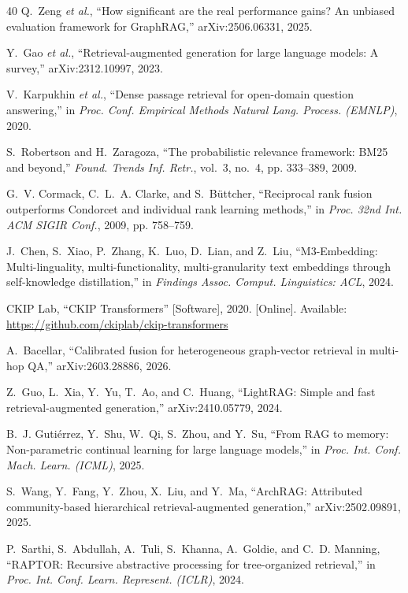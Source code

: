 \begin{thebibliography}{40}
Q.~Zeng \emph{et al.}, ``How significant are the real performance gains?
An unbiased evaluation framework for GraphRAG,'' arXiv:2506.06331, 2025.

Y.~Gao \emph{et al.}, ``Retrieval-augmented generation for large language
models: A survey,'' arXiv:2312.10997, 2023.

V.~Karpukhin \emph{et al.}, ``Dense passage retrieval for open-domain
question answering,'' in \emph{Proc. Conf. Empirical Methods Natural
Lang. Process. (EMNLP)}, 2020.

S.~Robertson and H.~Zaragoza, ``The probabilistic relevance framework:
BM25 and beyond,'' \emph{Found. Trends Inf. Retr.}, vol.~3, no.~4, pp.
333--389, 2009.

G.~V. Cormack, C.~L.~A. Clarke, and S.~B\"uttcher, ``Reciprocal rank
fusion outperforms Condorcet and individual rank learning methods,'' in
\emph{Proc. 32nd Int. ACM SIGIR Conf.}, 2009, pp. 758--759.

J.~Chen, S.~Xiao, P.~Zhang, K.~Luo, D.~Lian, and Z.~Liu,
``M3-Embedding: Multi-linguality, multi-functionality,
multi-granularity text embeddings through self-knowledge
distillation,'' in \emph{Findings Assoc. Comput. Linguistics: ACL},
2024.

CKIP Lab, ``CKIP Transformers'' [Software], 2020. [Online]. Available:
\url{https://github.com/ckiplab/ckip-transformers}

A.~Bacellar, ``Calibrated fusion for heterogeneous graph-vector retrieval
in multi-hop QA,'' arXiv:2603.28886, 2026.

Z.~Guo, L.~Xia, Y.~Yu, T.~Ao, and C.~Huang, ``LightRAG: Simple and fast
retrieval-augmented generation,'' arXiv:2410.05779, 2024.

B.~J. Guti\'errez, Y.~Shu, W.~Qi, S.~Zhou, and Y.~Su, ``From RAG to
memory: Non-parametric continual learning for large language models,'' in
\emph{Proc. Int. Conf. Mach. Learn. (ICML)}, 2025.

S.~Wang, Y.~Fang, Y.~Zhou, X.~Liu, and Y.~Ma, ``ArchRAG: Attributed
community-based hierarchical retrieval-augmented generation,''
arXiv:2502.09891, 2025.

P.~Sarthi, S.~Abdullah, A.~Tuli, S.~Khanna, A.~Goldie, and
C.~D. Manning, ``RAPTOR: Recursive abstractive processing for
tree-organized retrieval,'' in \emph{Proc. Int. Conf. Learn. Represent.
(ICLR)}, 2024.


\end{thebibliography}

